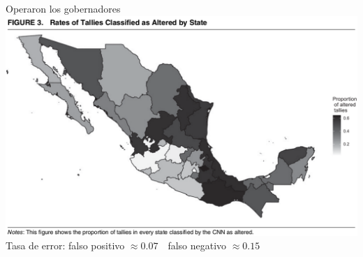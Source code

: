 \documentclass[bigger]{beamer}
\begin{document}
\begin{frame}[label={sec:org39e51f3}]{Operaron los gobernadores}
\includegraphics[width=\textwidth]{./pics/mapa-apsr.png} \\
\centering Tasa de error: falso positivo \(\approx 0.07~~~\) falso negativo \(\approx 0.15\)
\end{frame}
\end{document}
